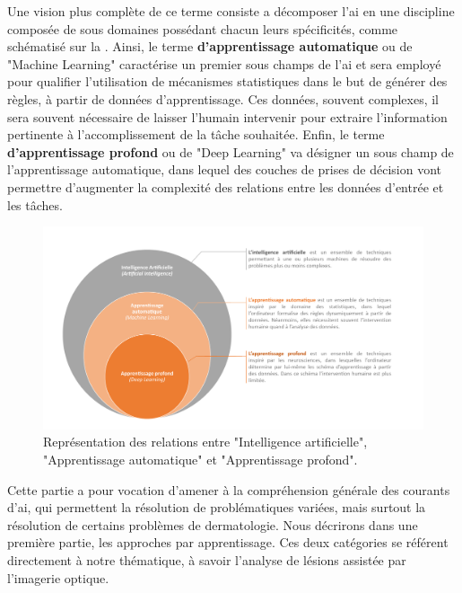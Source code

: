 Une vision plus complète de ce terme consiste a décomposer l'\gls{ai} en une discipline composée de sous domaines possédant chacun leurs spécificités, comme schématisé sur la . Ainsi, le terme \textbf{d'apprentissage automatique} ou de "Machine Learning" caractérise un premier sous champs de l'\gls{ai} et sera employé pour qualifier l'utilisation de mécanismes statistiques dans le but de générer des règles, à partir de données d'apprentissage. Ces données, souvent complexes, il sera souvent nécessaire de laisser l'humain intervenir pour extraire l'information pertinente à l'accomplissement de la tâche souhaitée. Enfin, le terme \textbf{d'apprentissage profond} ou de "Deep Learning" va désigner un sous champ de l'apprentissage automatique, dans lequel des couches de prises de décision vont permettre d'augmenter la complexité des relations entre les données d'entrée et les tâches.\par

\addtocounter{footnote}{1}

\begin{figure}[H]
    \centering
    \includegraphics[width=\linewidth]{contents/chapter_3/resources/scheme_overview_ia.pdf}
    \caption{Représentation des relations entre "Intelligence artificielle", "Apprentissage automatique" et "Apprentissage profond".}
    \label{fig:scheme_overview_ia}
\end{figure}\par

Cette partie a pour vocation d’amener à la compréhension générale des courants d’\gls{ai}, qui permettent la résolution de problématiques variées, mais surtout la résolution de certains problèmes de dermatologie. Nous décrirons dans une première partie, les approches par apprentissage. Ces deux catégories se référent directement à notre thématique, à savoir l’analyse de lésions assistée par l’imagerie optique.\par

